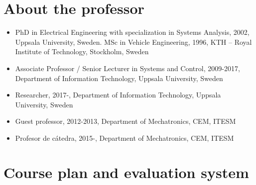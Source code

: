\documentclass[letter, 10pt]{scrartcl}
\begin{document}
\section*{About the professor}
\begin{itemize}[noitemsep]
\item PhD in Electrical Engineering with specialization in Systems Analysis, 2002, Uppsala University, Sweden. MSc in Vehicle Engineering, 1996, KTH -- Royal Institute of Technology, Stockholm, Sweden
\item Associate Professor / Senior Lecturer in Systems and Control, 2009-2017, Department of Information Technology, Uppsala University, Sweden
\item Researcher, 2017-, Department of Information Technology, Uppsala University, Sweden
\item Guest professor, 2012-2013,  Department of Mechatronics, CEM, ITESM
\item Profesor de cátedra, 2015-,  Department of Mechatronics, CEM, ITESM
\end{itemize}

\section*{Course plan and evaluation system}


\end{document}
